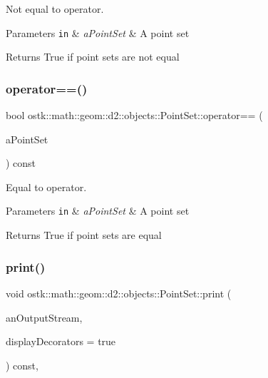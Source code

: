 Not equal to operator. 


\begin{DoxyParams}[1]{Parameters}
\mbox{\tt in}  & {\em a\+Point\+Set} & A point set \\
\hline
\end{DoxyParams}
\begin{DoxyReturn}{Returns}
True if point sets are not equal 
\end{DoxyReturn}
\mbox{\label{classostk_1_1math_1_1geom_1_1d2_1_1objects_1_1_point_set_adab3ff08c4e5413822f35408be2f2ec1}} 
\subsubsection{\texorpdfstring{operator==()}{operator==()}}
{\footnotesize\ttfamily bool ostk\+::math\+::geom\+::d2\+::objects\+::\+Point\+Set\+::operator== (\begin{DoxyParamCaption}\item[{const \hyperlink{classostk_1_1math_1_1geom_1_1d2_1_1objects_1_1_point_set}{Point\+Set} \&}]{a\+Point\+Set }\end{DoxyParamCaption}) const}



Equal to operator. 


\begin{DoxyParams}[1]{Parameters}
\mbox{\tt in}  & {\em a\+Point\+Set} & A point set \\
\hline
\end{DoxyParams}
\begin{DoxyReturn}{Returns}
True if point sets are equal 
\end{DoxyReturn}
\mbox{\label{classostk_1_1math_1_1geom_1_1d2_1_1objects_1_1_point_set_aef3263b63b2e9c9667365f58faee9ac7}} 
\subsubsection{\texorpdfstring{print()}{print()}}
{\footnotesize\ttfamily void ostk\+::math\+::geom\+::d2\+::objects\+::\+Point\+Set\+::print (\begin{DoxyParamCaption}\item[{std\+::ostream \&}]{an\+Output\+Stream,  }\item[{bool}]{display\+Decorators = {\ttfamily true} }\end{DoxyParamCaption}) const\hspace{0.3cm}{\ttfamily [override]}, {\ttfamily [virtual]}}



